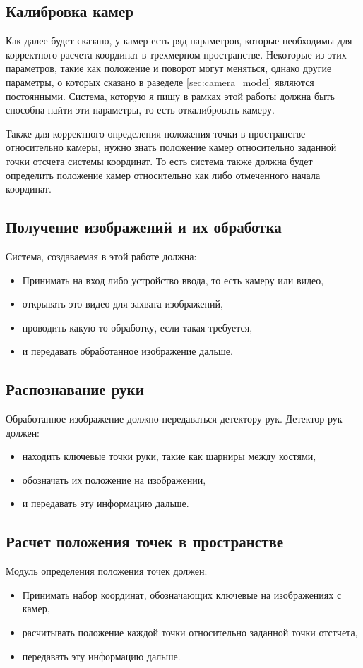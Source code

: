 \documentclass[12pt, a4paper]{article}
\begin{document}
\subsection{Калибровка камер}
Как далее будет сказано, у камер есть ряд параметров, которые необходимы для
корректного расчета координат в трехмерном пространстве. Некоторые из этих
параметров, такие как положение и поворот могут меняться, однако другие
параметры, о которых сказано в разеделе \ref{sec:camera_model} являются
постоянными.  Система, которую я пишу в рамках этой работы должна быть способна
найти эти параметры, то есть откалибровать камеру.
\par
Также для корректного определения положения точки в пространстве относительно
камеры, нужно знать положение камер относительно заданной точки отсчета системы
координат. То есть система также должна будет определить положение камер
относительно как либо отмеченного начала координат.

\subsection{Получение изображений и их обработка}
Система, создаваемая в этой работе должна:
\begin{itemize}
    \item Принимать на вход либо устройство ввода, то есть камеру или видео,
    \item открывать это видео для захвата изображений,
    \item проводить какую-то обработку, если такая требуется,
    \item и передавать обработанное изображение дальше.
\end{itemize} 

\subsection{Распознавание руки}
Обработанное изображение должно передаваться детектору рук. Детектор рук должен:
\begin{itemize}
    \item находить ключевые точки руки, такие как шарниры между костями,
    \item обозначать их положение на изображении,
    \item и передавать эту информацию дальше.
\end{itemize}   

\subsection{Расчет положения точек в пространстве}
\label{sec:point_placement_arch}
Модуль определения положения точек должен:
\begin{itemize}
    \item Принимать набор координат, обозначающих ключевые на изображениях с камер,
    \item расчитывать положение каждой точки относительно заданной точки отстчета,
    \item передавать эту информацию дальше.
\end{itemize}
\end{document}
